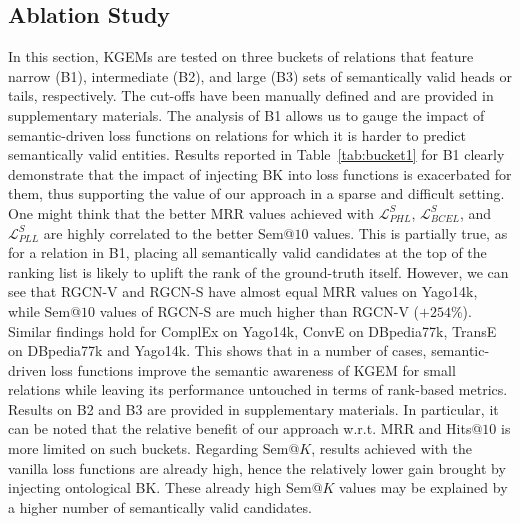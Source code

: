 \documentclass[letterpaper]{article} %
\begin{document}
\subsection{Ablation Study}
In this section, KGEMs are tested on three buckets of relations that feature narrow (B1), intermediate (B2), and large (B3) sets of semantically valid heads or tails, respectively. The cut-offs have been manually defined and are provided in supplementary materials. The analysis of B1 allows us to gauge the impact of semantic-driven loss functions on relations for which it is harder to predict semantically valid entities. Results reported in Table~\ref{tab:bucket1} for B1 clearly demonstrate that the impact of injecting BK into loss functions is exacerbated for them, thus supporting the value of our approach in a sparse and difficult setting. One might think that the better MRR values achieved with $\mathcal{L}^{S}_{PHL}$, $\mathcal{L}^{S}_{BCEL}$, and $\mathcal{L}^{S}_{PLL}$ are highly correlated to the better Sem@$10$ values. This is partially true, as for a relation in B1, placing all semantically valid candidates at the top of the ranking list is likely to uplift the rank of the ground-truth itself. However, we can see that RGCN-V and RGCN-S have almost equal MRR values on Yago14k, while Sem@$10$ values of RGCN-S are much higher than RGCN-V ($+254\%$). Similar findings hold for ComplEx on Yago14k, ConvE on DBpedia77k, TransE on DBpedia77k and Yago14k. This shows that in a number of cases, semantic-driven loss functions improve the semantic awareness of KGEM for small relations while leaving its performance untouched in terms of rank-based metrics. 
Results on B2 and B3 are provided in supplementary materials. In particular, it can be noted that the relative benefit of our approach w.r.t. MRR and Hits@$10$ is more limited on such buckets. Regarding Sem@$K$, results achieved with the vanilla loss functions are already high, hence the relatively lower gain brought by injecting ontological BK. 
These already high Sem@$K$ values may be explained by a higher number of semantically valid candidates. 
\end{document}
